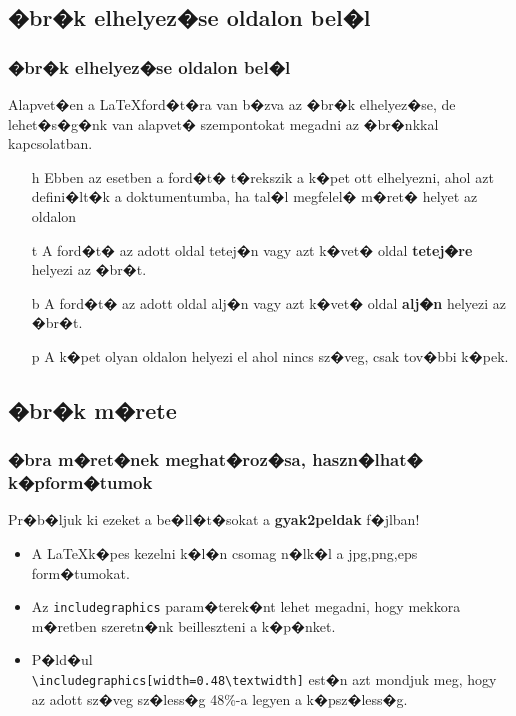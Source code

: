\documentclass[xcolor=pdftex,dvipsnames,table,compress,bigger]{beamer}
\begin{document}
\subsection{�br�k elhelyez�se oldalon bel�l}
\begin{frame}
	\frametitle{�br�k elhelyez�se oldalon bel�l}
Alapvet�en a \LaTeX ford�t�ra van b�zva az �br�k elhelyez�se, de lehet�s�g�nk van alapvet� szempontokat megadni az �br�nkkal kapcsolatban.
	\begin{block}{}
		\begin{itemize}
			
			\item[h] Ebben az esetben a ford�t� t�rekszik a k�pet ott elhelyezni, ahol azt defini�lt�k a doktumentumba, ha tal�l megfelel� m�ret� helyet az oldalon

			\item[t] A ford�t� az adott oldal tetej�n vagy azt k�vet� oldal \textbf{tetej�re} helyezi az �br�t.

			\item[b]  A ford�t� az adott oldal alj�n vagy azt k�vet� oldal \textbf{alj�n} helyezi az �br�t.

			\item[p] A k�pet olyan oldalon helyezi el ahol nincs sz�veg, csak tov�bbi k�pek.\\
		\end{itemize}
	\end{block}
\end{frame}

\subsection{�br�k m�rete}
\begin{frame}[fragile]
	\frametitle{�bra m�ret�nek meghat�roz�sa, haszn�lhat� k�pform�tumok}
	\begin{block}{Pr�b�ljuk ki ezeket a be�ll�t�sokat a \textbf{gyak2peldak} f�jlban!}
		\begin{itemize}
			\item A \LaTeX  k�pes kezelni k�l�n csomag n�lk�l a jpg,png,eps form�tumokat.
			\item Az \verb*|includegraphics| param�terek�nt lehet megadni, hogy mekkora m�retben szeretn�nk beilleszteni a k�p�nket. 
			\item P�ld�ul\\
    \verb*|\includegraphics[width=0.48\textwidth]|
est�n azt mondjuk meg, hogy az adott sz�veg sz�less�g 48\%-a legyen a k�psz�less�g.
		\end{itemize}
	\end{block}
\end{frame}
\end{document}
